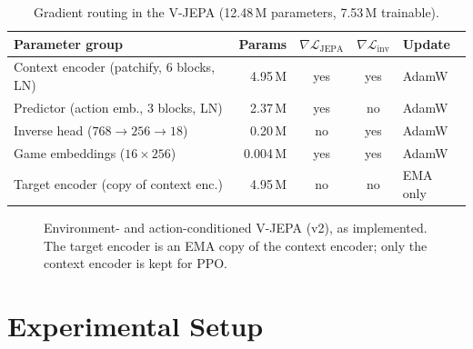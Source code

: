 \documentclass[runningheads]{llncs}
\begin{document}
\begin{table}[t]
\centering
\caption{Gradient routing in the V-JEPA (12.48\,M parameters, 7.53\,M trainable).}
\label{tab:grad}
\footnotesize\setlength{\tabcolsep}{4pt}
\begin{tabular}{@{}lrccl@{}}
\toprule
Parameter group & Params & $\nabla\mathcal{L}_{\text{JEPA}}$ & $\nabla\mathcal{L}_{\text{inv}}$ & Update \\
\midrule
Context encoder (patchify, 6 blocks, LN) & 4.95\,M & yes & yes & AdamW \\
Predictor (action emb., 3 blocks, LN) & 2.37\,M & yes & no & AdamW \\
Inverse head ($768\to256\to18$) & 0.20\,M & no & yes & AdamW \\
Game embeddings ($16\times256$) & 0.004\,M & yes & yes & AdamW \\
Target encoder (copy of context enc.) & 4.95\,M & no & no & EMA only \\
\bottomrule
\end{tabular}
\end{table}

\begin{figure}[t]
\centering

\caption{Environment- and action-conditioned V-JEPA (v2), as implemented. The target
encoder is an EMA copy of the context encoder; only the context encoder is kept for PPO.}
\label{fig:jepa}
\end{figure}

\section{Experimental Setup}
\label{sec:setup}
\end{document}
